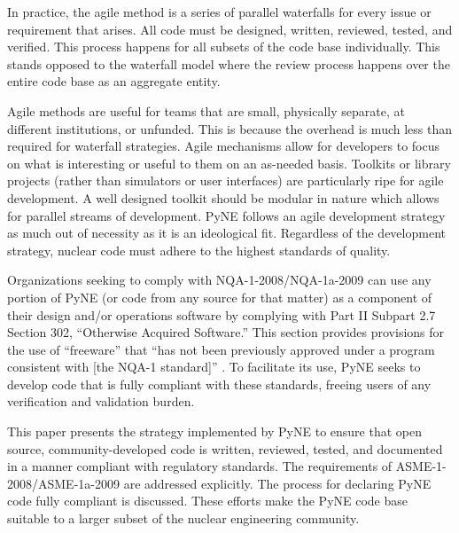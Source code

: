 \documentclass{anstrans}
\begin{document}
In practice, the agile method is a series of parallel waterfalls for every issue
or requirement that arises. All code must be designed, written, reviewed, 
tested, and verified. This process happens for all subsets of the code base
individually. This stands opposed to the waterfall model where the review 
process happens over the entire code base as an aggregate entity.

Agile methods are useful for teams that are small, physically separate, at
different institutions, or unfunded. This is because the overhead is much 
less than required for waterfall strategies.  Agile mechanisms allow for developers
to focus on what is interesting or useful to them on an as-needed basis.
Toolkits or library projects (rather than simulators or user interfaces) are 
particularly ripe for agile development. A well designed toolkit should be 
modular in nature which allows for parallel streams of development.  
PyNE follows an agile development strategy as much out of necessity as it
is an ideological fit.  Regardless of the development strategy, nuclear code
must adhere to the highest standards of quality.

Organizations seeking to comply with NQA-1-2008/NQA-1a-2009 can use any portion
of PyNE (or code from any source for that matter) as a component of their
design and/or operations software by complying with Part II Subpart 2.7 Section
302, ``Otherwise Acquired Software.'' This section provides provisions for the
use of ``freeware'' that ``has not been previously approved under a program
consistent with [the NQA-1 standard]'' \cite{add}.  To facilitate its use, PyNE
seeks to develop code that is fully compliant with these standards, freeing users of
any verification and validation burden.

This paper presents the strategy implemented by PyNE to ensure that
open source, community-developed code is written, reviewed, tested, and
documented in a manner compliant with regulatory standards. The requirements of
ASME-1-2008/ASME-1a-2009 are addressed explicitly. The process for declaring
PyNE code fully compliant is discussed. These efforts make the PyNE code base suitable
to a larger subset of the nuclear engineering community.
\end{document}
